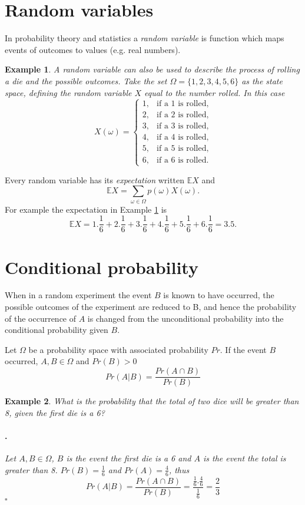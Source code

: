 \documentclass[12pt, a4paper,leqno]{report}
\newenvironment{solution}{\paragraph{\normalfont{\textit{Solution}}.}}{\hfill\null$\square$}
\theoremstyle{normal}
\theoremstyle{normal}
\newtheorem{example}{Example}[chapter]
\def\expect{\mathbb{E}}
\begin{document}
	\section{Random variables}
	In probability theory and statistics a \textit{random variable} is function which maps events of outcomes to values (e.g. real numbers). 
	
	\begin{example}
		\label{ex:die_x}
		A random variable can also be used to describe the process of rolling a die and the possible outcomes. Take the set $\Omega = \lbrace 1, 2, 3, 4, 5, 6\rbrace$ as the state space, defining the random variable $X$ equal to the number rolled.
		In this case
		\[ X(\omega) = \begin{cases}
			1, & \text{if a 1 is rolled} ,\\
			2, & \text{if a 2 is rolled} ,\\
			3, & \text{if a 3 is rolled} ,\\
			4, & \text{if a 4 is rolled} ,\\
			5, & \text{if a 5 is rolled} ,\\
			6, & \text{if a 6 is rolled} .
		\end{cases} \]
	\end{example}
	
	Every random variable has its \textit{expectation} written $\expect X$ and
	\[ \expect X = \sum\limits_{\omega\in \Omega} p(\omega) X(\omega). \]
	For example the expectation in Example \ref{ex:die_x} is
	\[ \expect X = 1.\frac{1}{6} + 2.\frac{1}{6} + 3.\frac{1}{6} + 4.\frac{1}{6} + 5.\frac{1}{6} + 6.\frac{1}{6} = 3.5 . \]
	
	\section{Conditional probability}	
	When in a random experiment the event $B$ is known to have occurred, the possible outcomes of the experiment are reduced to B, and hence the probability of the occurrence of $A$ is changed from the unconditional probability into the conditional probability given $B$.
	
	Let $\Omega$ be a probability space with associated probability $Pr$. If the event $B$ occurred, $A,B\in\Omega$ and $Pr(B) > 0$
	\[ Pr(A|B) = \frac{Pr(A\cap B)}{Pr(B)} \] 
	
	\begin{example}
		What is the probability that the total of two dice will be greater than 8, given the first die is a 6?
		\begin{solution}
			Let $A, B\in\Omega$, $B$ is the event the first die is a 6 and $A$ is the event the total is greater than 8.
			$Pr(B) = \frac{1}{6}$ and $Pr(A) = \frac{4}{6}$, thus
			\[ Pr(A|B) = \frac{Pr(A\cap B)}{Pr(B)} = \frac{\frac{1}{6}.\frac{4}{6}}{\frac{1}{6}} = \frac{2}{3} \]
		\end{solution}
	\end{example}
	
\end{document}
